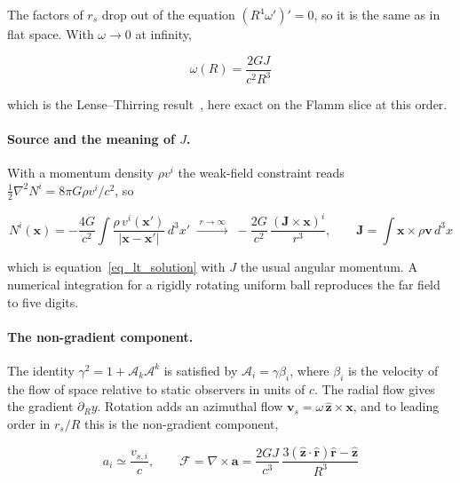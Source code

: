 \documentclass[anonymous]{iopjournal}
\begin{document}
The factors of $r_s$ drop out of the equation $\left(R^4\omega'\right)'=0$, so it is the same as in flat space. With $\omega\to0$ at infinity,

\begin{equation}\label{eq_lt_solution}
    \omega(R)=\frac{2GJ}{c^2R^3}
\end{equation}

which is the Lense--Thirring result~\cite{LenseThirring1918}, here exact on the Flamm slice at this order.

\paragraph{Source and the meaning of $J$.} With a momentum density $\rho v^i$ the weak-field constraint reads $\tfrac12\nabla^2N^i=8\pi G\rho v^i/c^2$, so

\begin{equation}
    N^i(\mathbf{x})=-\frac{4G}{c^2}\int\frac{\rho\,v^i(\mathbf{x}')}{|\mathbf{x}-\mathbf{x}'|}\,d^3x'
    \;\xrightarrow{\;r\to\infty\;}\;
    -\frac{2G}{c^2}\,\frac{(\mathbf{J}\times\mathbf{x})^i}{r^3},
    \qquad
    \mathbf{J}=\int\mathbf{x}\times\rho\mathbf{v}\,d^3x
\end{equation}

which is equation~\eqref{eq_lt_solution} with $J$ the usual angular momentum. A numerical integration for a rigidly rotating uniform ball reproduces the far field to five digits.

\paragraph{The non-gradient component.} The identity $\gamma^2=1+\mathcal{A}_k\mathcal{A}^k$ is satisfied by $\mathcal{A}_i=\gamma\beta_i$, where $\beta_i$ is the velocity of the flow of space relative to static observers in units of $c$. The radial flow gives the gradient $\partial_R y$. Rotation adds an azimuthal flow $\mathbf{v}_s=\omega\,\hat{\mathbf{z}}\times\mathbf{x}$, and to leading order in $r_s/R$ this is the non-gradient component,

\begin{equation}\label{eq_nongradient_flow}
    a_i\simeq\frac{v_{s,i}}{c},
    \qquad
    \mathcal{F}=\nabla\times\mathbf{a}=\frac{2GJ}{c^3}\,\frac{3(\hat{\mathbf{z}}\cdot\hat{\mathbf{r}})\hat{\mathbf{r}}-\hat{\mathbf{z}}}{R^3}
\end{equation}
\end{document}
